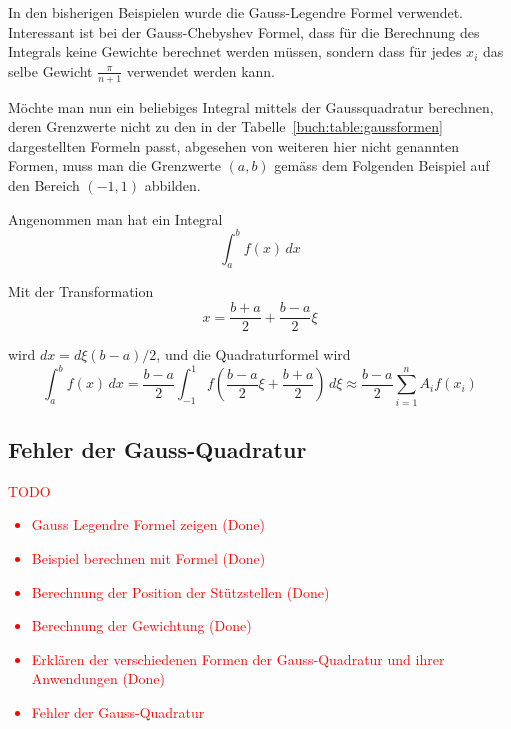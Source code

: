 \noindent
In den bisherigen Beispielen wurde die Gauss-Legendre Formel verwendet.
Interessant ist bei der Gauss-Chebyshev Formel, 
dass für die Berechnung des Integrals keine Gewichte berechnet werden müssen,
sondern dass für jedes $x_{i}$ das selbe Gewicht $\frac{\pi}{n+1}$ verwendet werden kann.

\noindent
Möchte man nun ein beliebiges Integral mittels der Gaussquadratur berechnen,
deren Grenzwerte nicht zu den in der Tabelle~\ref{buch:table:gaussformen} 
dargestellten Formeln passt, 
abgesehen von weiteren hier nicht genannten Formen, 
muss man die Grenzwerte $(a, b)$ gemäss dem Folgenden Beispiel
auf den Bereich $(-1, 1)$ abbilden.


\noindent
Angenommen man hat ein Integral
\begin{equation}
    \int_{a}^{b}f(x)\,dx
\end{equation}

\noindent
Mit der Transformation
\begin{equation}
    x = \frac{b + a}{2} + \frac{b - a}{2}\xi    
\end{equation}

\noindent
wird $dx = d\xi(b - a)/2$, und die Quadraturformel wird
\begin{equation}
    \int_{a}^{b}f(x)\,dx = \frac{b - a}{2} \int_{-1}^{1}f(\frac{b - a}{2}\xi + \frac{b + a}{2})\, d\xi \approx \frac{b - a}{2} \sum_{i=1}^{n} A_{i}f(x_{i})
\end{equation}
    
\newpage

\subsection{Fehler der Gauss-Quadratur
\label{quadratur:subsection:gaussfehler}}



\textcolor{red}{
    TODO
    \begin{itemize}
        \item Gauss Legendre Formel zeigen (Done)
        \item Beispiel berechnen mit Formel (Done)
        \item Berechnung der Position der Stützstellen (Done)
        \item Berechnung der Gewichtung (Done)
        \item Erklären der verschiedenen Formen der Gauss-Quadratur und ihrer Anwendungen (Done)
        \item Fehler der Gauss-Quadratur
    \end{itemize}
}
